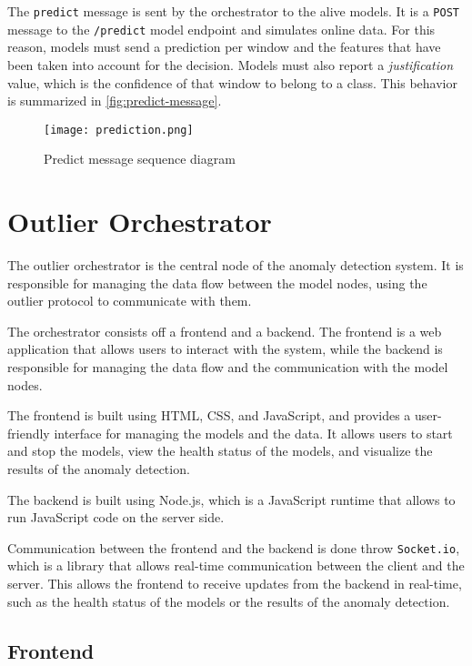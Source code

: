 The \texttt{predict} message is sent by the orchestrator to the alive models. It is a \texttt{POST} message to the \texttt{/predict} model endpoint and simulates online data. For this reason, models must send a prediction per window and the features that have been taken into account for the decision. Models must also report a \textit{justification} value, which is the confidence of that window to belong to a class. This behavior is summarized in \autoref{fig:predict-message}.

\begin{figure}[H]
    \centering
    \texttt{[image: prediction.png]}
    \caption{Predict message sequence diagram}
    \label{fig:predict-message}
\end{figure}

\section{Outlier Orchestrator}\label{sec:orchestrator}

The outlier orchestrator is the central node of the anomaly detection system. It is responsible for managing the data flow between the model nodes, using the outlier protocol to communicate with them.

The orchestrator consists off a frontend and a backend. The frontend is a web application that allows users to interact with the system, while the backend is responsible for managing the data flow and the communication with the model nodes.

The frontend is built using HTML, CSS, and JavaScript, and provides a user-friendly interface for managing the models and the data. It allows users to start and stop the models, view the health status of the models, and visualize the results of the anomaly detection.

The backend is built using Node.js, which is a JavaScript runtime that allows to run JavaScript code on the server side.

Communication between the frontend and the backend is done throw \texttt{Socket.io}, which is a library that allows real-time communication between the client and the server. This allows the frontend to receive updates from the backend in real-time, such as the health status of the models or the results of the anomaly detection.

\subsection{Frontend}

